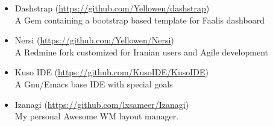 \documentclass[a4paper,11pt]{article}
\begin{document}
\begin{itemize}
\item Dashstrap (\url{https://github.com/Yellowen/dashstrap})\\
  A Gem containing a bootstrap based template for Faalis dashboard

\item Nersi (\url{https://github.com/Yellowen/Nersi})\\
  A Redmine fork customized for Iranian users and Agile development

\item Kuso IDE (\url{https://github.com/KusoIDE/KusoIDE})\\
  A Gnu/Emacs base IDE with special goals

\item Izanagi (\url{https://github.com/lxsameer/Izanagi})\\
  My personal Awesome WM layout manager.


\end{itemize}
\end{document}
